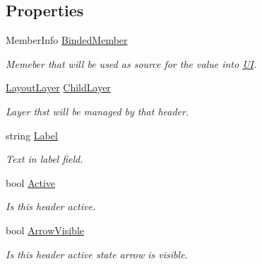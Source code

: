 \subsection*{Properties}
\begin{DoxyCompactItemize}
\item 
Member\+Info \mbox{\hyperlink{class_wpf_handler_1_1_u_i_1_1_controls_1_1_header_a520cdfcc6671c954b6b889f61082244c}{Binded\+Member}}
\begin{DoxyCompactList}\small\item\em Memeber that will be used as source for the value into \mbox{\hyperlink{namespace_wpf_handler_1_1_u_i}{UI}}. \end{DoxyCompactList}\item 
\mbox{\hyperlink{class_wpf_handler_1_1_u_i_1_1_auto_layout_1_1_layout_layer}{Layout\+Layer}} \mbox{\hyperlink{class_wpf_handler_1_1_u_i_1_1_controls_1_1_header_a3947ddcb07258827b26c25d9ca0f242d}{Child\+Layer}}
\begin{DoxyCompactList}\small\item\em Layer thst will be managed by that header. \end{DoxyCompactList}\item 
string \mbox{\hyperlink{class_wpf_handler_1_1_u_i_1_1_controls_1_1_header_a6ea05d5b82deba64afc724e79a93275e}{Label}}
\begin{DoxyCompactList}\small\item\em Text in label field. \end{DoxyCompactList}\item 
bool \mbox{\hyperlink{class_wpf_handler_1_1_u_i_1_1_controls_1_1_header_a020e75c12da978773cd2a3f0089e0644}{Active}}
\begin{DoxyCompactList}\small\item\em Is this header active. \end{DoxyCompactList}\item 
bool \mbox{\hyperlink{class_wpf_handler_1_1_u_i_1_1_controls_1_1_header_a982c296a72324bf0fab5076cebd60928}{Arrow\+Visible}}
\begin{DoxyCompactList}\small\item\em Is this header active state arrow is visible. \end{DoxyCompactList}\item 

\end{DoxyCompactItemize}
